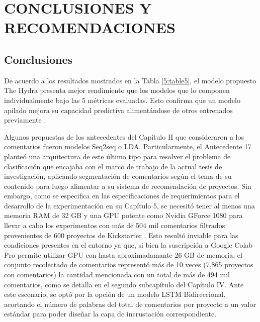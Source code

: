 \chapter{CONCLUSIONES Y RECOMENDACIONES}
\section{Conclusiones}
De acuerdo a los resultados mostrados en la Tabla \ref{5:table5}, el modelo propuesto The Hydra presenta mejor rendimiento que los modelos que lo componen individualmente bajo las 5 métricas evaluadas. Esto confirma que un modelo apilado mejora su capacidad predictiva alimentándose de otros entrenados previamente \parencite{tec_brownlee2018stacked_models}.

Algunos propuestas de los antecedentes del Capítulo II que consideraron a los comentarios fueron modelos Seq2seq o LDA. Particularmente, el Antecedente 17 planteó una arquitectura de este último tipo para resolver el problema de clasificación que encajaba con el marco de trabajo de la actual tesis de investigación, aplicando segmentación de comentarios según el tema de su contenido para luego alimentar a su sistema de recomendación de proyectos. Sin embargo, como se especifica en las especificaciones de requerimientos para el desarrollo de la experimentación en su Capítulo 5, se necesitó tener al menos una memoria RAM de 32 GB y una GPU potente como Nvidia GForce 1080 para llevar a cabo los experimentos con más de 504 mil comentarios filtrados provenientes de 600 proyectos de Kickstarter \parencite{pr_shafqat2019topicpredictions}. Esto resultó inviable para las condiciones presentes en el entorno ya que, si bien la suscripción a Google Colab Pro permite utilizar GPU con hasta aproximadamante 26 GB de memoria, el conjunto recolectado de comentarios representó más de 10 veces (7,865 proyectos con comentarios) la cantidad mencionada con un total de más de 494 mil comentarios, como se detalla en el segundo subcapítulo del Capítulo IV. Ante este escenario, se optó por la opción de un modelo LSTM Bidireccional, acortando el número de palabras del total de comentarios por proyecto a un valor estándar para poder diseñar la capa de incrustación correspondiente.

